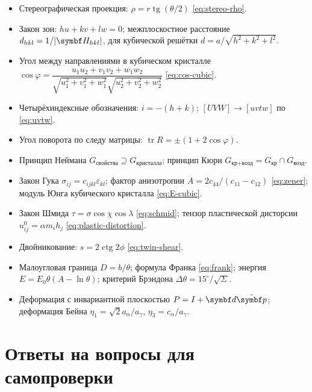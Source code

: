 \begin{itogi}
\begin{itemize}
\item Стереографическая проекция: $\rho=r\operatorname{tg}(\theta/2)$
\eqref{eq:stereo-rho}.
\item Закон зон: $hu+kv+lw=0$; межплоскостное расстояние $d_{hkl}=1/|\vb H_{hkl}|$,
для кубической решётки $d=a/\sqrt{h^2+k^2+l^2}$.
\item Угол между направлениями в кубическом кристалле
$\cos\varphi=\dfrac{u_1u_2+v_1v_2+w_1w_2}{\sqrt{u_1^2+v_1^2+w_1^2}\sqrt{u_2^2+v_2^2+w_2^2}}$
\eqref{eq:cos-cubic}.
\item Четырёхиндексные обозначения: $i=-(h+k)$; $[UVW]\to[uvtw]$ по
\eqref{eq:uvtw}.
\item Угол поворота по следу матрицы: $\operatorname{tr}R=\pm(1+2\cos\varphi)$.
\item Принцип Неймана $G_\text{свойства}\supseteq G_\text{кристалла}$;
принцип Кюри $G_\text{кр+возд}=G_\text{кр}\cap G_\text{возд}$.
\item Закон Гука $\sigma_{ij}=c_{ijkl}\varepsilon_{kl}$; фактор анизотропии
$A=2c_{44}/(c_{11}-c_{12})$ \eqref{eq:zener}; модуль Юнга кубического кристалла
\eqref{eq:E-cubic}.
\item Закон Шмида $\tau=\sigma\cos\chi\cos\lambda$ \eqref{eq:schmid};
тензор пластической дисторсии $u^0_{ij}=\alpha m_ih_j$ \eqref{eq:plastic-distortion}.
\item Двойникование: $s=2\operatorname{ctg}2\phi$ \eqref{eq:twin-shear}.
\item Малоугловая граница $D=b/\theta$; формула Франка \eqref{eq:frank};
энергия $E=E_0\theta(A-\ln\theta)$; критерий Брэндона
$\Delta\theta=15^\circ/\sqrt\Sigma$.
\item Деформация с инвариантной плоскостью $P=I+\vb d\tilde{\vb p}$;
деформация Бейна $\eta_1=\sqrt2a_\alpha/a_\gamma$, $\eta_3=c_\alpha/a_\gamma$.
\end{itemize}
\end{itogi}

\section*{Ответы на вопросы для самопроверки}

